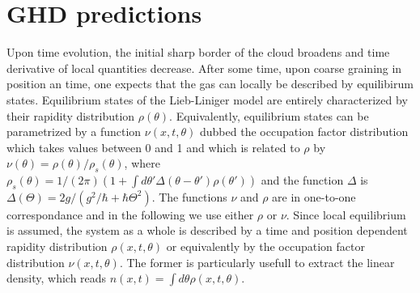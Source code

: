 \documentclass[submission, Phys]{SciPost}
\begin{document}
\section{GHD predictions}
Upon time evolution, the initial sharp border of the cloud broadens and time
derivative of local quantities decrease. 
After some time, %
upon coarse graining in position an time, one expects that the gas can locally be described by equilibirum states.
Equilibrium states of the Lieb-Liniger model are entirely characterized 
by their rapidity distribution $\rho(\theta)$.
Equivalently, equilibrium states can be parametrized by  a function $\nu(x,t,\theta)$ dubbed the occupation factor distribution which takes values between 0 and 1 and which is related to  
$\rho$ by $\nu(\theta)=\rho(\theta)/\rho_s(\theta)$, where $\rho_s(\theta)=
1/(2\pi) \left (1+ \int d\theta' \Delta(\theta-\theta') \rho(\theta')\right ) $
and the function $\Delta$ is $\Delta(\Theta)=2g/(g^2/\hbar+\hbar\Theta^2)$. 
 The functions $\nu$ and $\rho$ are in one-to-one correspondance and in the following we use either $\rho$ or $\nu$. 
Since local equilibrium is assumed, the system as a whole is described by a time and position dependent rapidity distribution $\rho(x,t,\theta)$ or equivalently by the 
occupation factor distribution $\nu(x,t,\theta)$. The former is particularly usefull to extract the linear density, which reads $n(x,t)=\int d\theta \rho(x,t,\theta)$.
\end{document}
